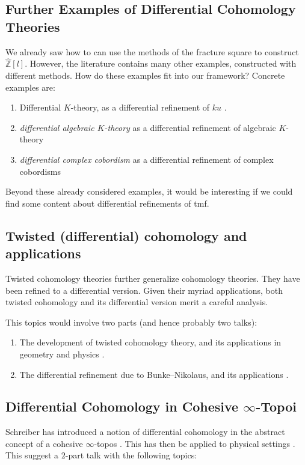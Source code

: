 \documentclass[a4paper]{book}
\newcommand{\bZ}{\mathbb{Z}}
\theoremstyle{definition}
\theoremstyle{remark}
\numberwithin{equation}{section}
\begin{document}
\subsection{Further Examples of Differential Cohomology Theories} \label{subsec:examples}
We already saw how to can use the methods of the fracture square to construct $\hat{\bZ}[l]$. However, the literature contains many other examples, constructed with different methods. How do these examples fit into our framework? Concrete examples are:
\begin{enumerate}
  \item Differential $K$-theory, as a differential refinement of $ku$  \cite{hopkinssinger2005diffcoh}.
  \item  \emph{differential algebraic $K$-theory} as a differential refinement of algebraic $K$-theory \cite{bunkegepner2021diffktheory}
  \item \emph{differential complex cobordism} as a differential refinement of complex cobordisms \cite{bunkeschickschroederwiethaup2009landweber}
\end{enumerate}

Beyond these already considered examples, it would be interesting if we could find some content about differential refinements of tmf.

\subsection{Twisted (differential) cohomology and applications} \label{subsec:twisted}
Twisted cohomology theories further generalize cohomology theories. They have been refined to a differential version. Given their myriad applications, both twisted cohomology and its differential version merit a careful analysis.

This topics would involve two parts (and hence probably two talks):
\begin{enumerate}
  \item The development of twisted cohomology theory, and its applications in geometry and physics \cite{rosenberg2024twistedcohomology}. 
  \item The differential refinement due to Bunke--Nikolaus, and its applications \cite{bunkenikolaus2019twisted}.
\end{enumerate}

\subsection{Differential Cohomology in Cohesive \texorpdfstring{$\infty$}{oo}-Topoi} \label{subsec:cohesion}
Schreiber has introduced a notion of differential cohomology in the abstract concept of a cohesive $\infty$-topos \cite{schreiber2013differentialcohomology}. This has then be applied to physical settings \cite{fiorenzasatischreiber2024charactermap}. This suggest a $2$-part talk with the following topics:
\end{document}
